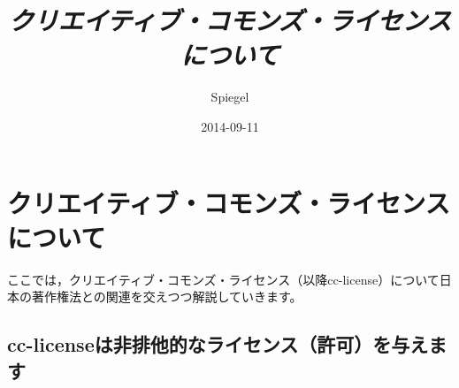 \documentclass{ltjsarticle}
\title{\emph{クリエイティブ・コモンズ・ライセンスについて}}
\author{Spiegel}
\date{2014-09-11}
\begin{document}
\maketitle
\tableofcontents
\clearpage

\section{クリエイティブ・コモンズ・ライセンスについて}

ここでは，クリエイティブ・コモンズ・ライセンス（以降cc-license）について日本の著作権法との関連を交えつつ解説していきます。

\subsection{cc-licenseは非排他的なライセンス（許可）を与えます}
\end{document}
